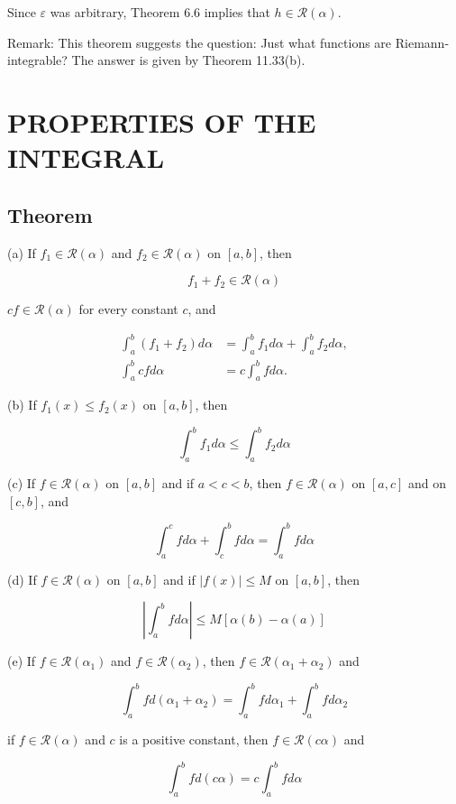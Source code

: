 \documentclass[10pt]{article}
\begin{document}
Since $\varepsilon$ was arbitrary, Theorem 6.6 implies that $h \in \mathscr{R}(\alpha)$.

Remark: This theorem suggests the question: Just what functions are Riemann-integrable? The answer is given by Theorem 11.33(b).

\section{PROPERTIES OF THE INTEGRAL}
\subsection{Theorem}
(a) If $f_{1} \in \mathscr{R}(\alpha)$ and $f_{2} \in \mathscr{R}(\alpha)$ on $[a, b]$, then

$$
f_{1}+f_{2} \in \mathscr{R}(\alpha)
$$

$c f \in \mathscr{R}(\alpha)$ for every constant $c$, and

$$
\begin{aligned}
\int_{a}^{b}\left(f_{1}+f_{2}\right) d \alpha & =\int_{a}^{b} f_{1} d \alpha+\int_{a}^{b} f_{2} d \alpha, \\
\int_{a}^{b} c f d \alpha & =c \int_{a}^{b} f d \alpha .
\end{aligned}
$$

(b) If $f_{1}(x) \leq f_{2}(x)$ on $[a, b]$, then

$$
\int_{a}^{b} f_{1} d \alpha \leq \int_{a}^{b} f_{2} d \alpha
$$

(c) If $f \in \mathscr{R}(\alpha)$ on $[a, b]$ and if $a<c<b$, then $f \in \mathscr{R}(\alpha)$ on $[a, c]$ and on $[c, b]$, and

$$
\int_{a}^{c} f d \alpha+\int_{c}^{b} f d \alpha=\int_{a}^{b} f d \alpha
$$

(d) If $f \in \mathscr{R}(\alpha)$ on $[a, b]$ and if $|f(x)| \leq M$ on $[a, b]$, then

$$
\left|\int_{a}^{b} f d \alpha\right| \leq M[\alpha(b)-\alpha(a)]
$$

(e) If $f \in \mathscr{R}\left(\alpha_{1}\right)$ and $f \in \mathscr{R}\left(\alpha_{2}\right)$, then $f \in \mathscr{R}\left(\alpha_{1}+\alpha_{2}\right)$ and

$$
\int_{a}^{b} f d\left(\alpha_{1}+\alpha_{2}\right)=\int_{a}^{b} f d \alpha_{1}+\int_{a}^{b} f d \alpha_{2}
$$

if $f \in \mathscr{R}(\alpha)$ and $c$ is a positive constant, then $f \in \mathscr{R}(c \alpha)$ and

$$
\int_{a}^{b} f d(c \alpha)=c \int_{a}^{b} f d \alpha
$$
\end{document}
